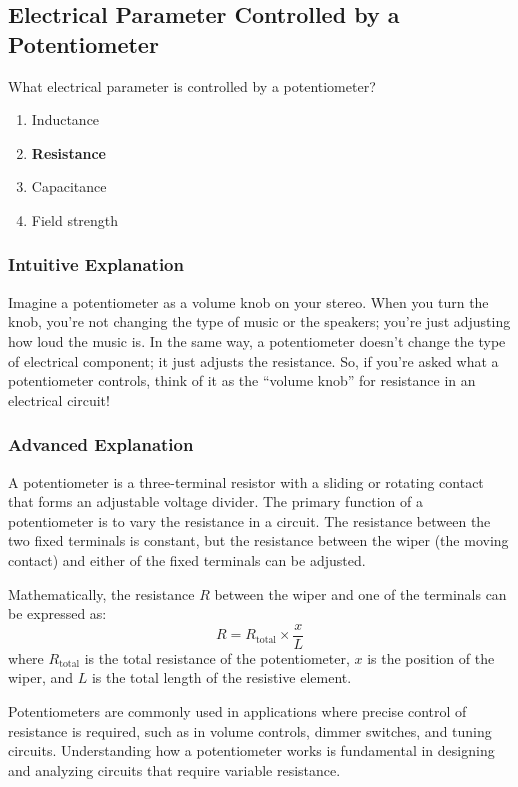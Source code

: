 \subsection{Electrical Parameter Controlled by a Potentiometer}
\label{T6A03}

\begin{tcolorbox}[colback=gray!10!white,colframe=black!75!black,title=T6A03]
What electrical parameter is controlled by a potentiometer?
\begin{enumerate}[label=\Alph*]
    \item Inductance
    \item \textbf{Resistance}
    \item Capacitance
    \item Field strength
\end{enumerate}
\end{tcolorbox}

\subsubsection{Intuitive Explanation}
Imagine a potentiometer as a volume knob on your stereo. When you turn the knob, you’re not changing the type of music or the speakers; you’re just adjusting how loud the music is. In the same way, a potentiometer doesn’t change the type of electrical component; it just adjusts the resistance. So, if you’re asked what a potentiometer controls, think of it as the “volume knob” for resistance in an electrical circuit!

\subsubsection{Advanced Explanation}
A potentiometer is a three-terminal resistor with a sliding or rotating contact that forms an adjustable voltage divider. The primary function of a potentiometer is to vary the resistance in a circuit. The resistance between the two fixed terminals is constant, but the resistance between the wiper (the moving contact) and either of the fixed terminals can be adjusted. 

Mathematically, the resistance \( R \) between the wiper and one of the terminals can be expressed as:
\[ R = R_{\text{total}} \times \frac{x}{L} \]
where \( R_{\text{total}} \) is the total resistance of the potentiometer, \( x \) is the position of the wiper, and \( L \) is the total length of the resistive element.

Potentiometers are commonly used in applications where precise control of resistance is required, such as in volume controls, dimmer switches, and tuning circuits. Understanding how a potentiometer works is fundamental in designing and analyzing circuits that require variable resistance.

